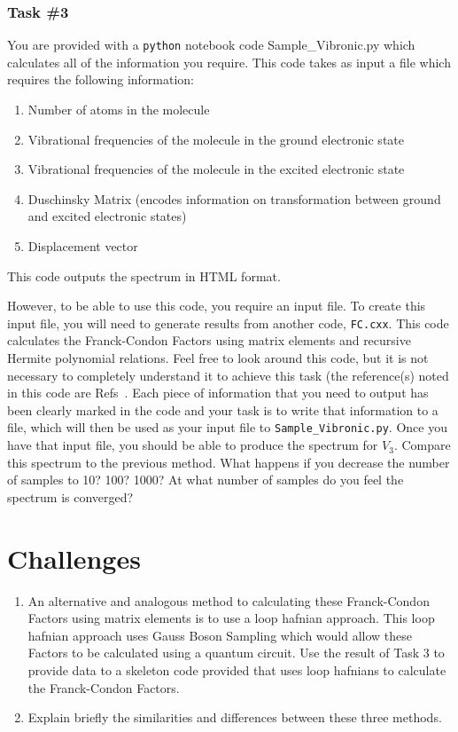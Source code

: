 \documentclass[12pt]{article}
\begin{document}
\subsubsection*{Task \#3}

You are provided with a \texttt{python} notebook code Sample\_Vibronic.py which calculates all of the information you require.
\noindent This code takes as input a file which requires the following information:
\begin{enumerate}
    \item Number of atoms in the molecule
    \item Vibrational frequencies of the molecule in the ground electronic state
    \item Vibrational frequencies of the molecule in the excited electronic state
    \item Duschinsky Matrix (encodes information on transformation between ground and excited electronic states)
    \item Displacement vector
\end{enumerate}

\noindent This code outputs the spectrum in HTML format.

However, to be able to use this code, you require an input file. To create this input file, you will need to generate results from another code, \texttt{FC.cxx}. This code calculates the Franck-Condon Factors using matrix elements and recursive Hermite polynomial relations. Feel free to look around this code, but it is not necessary to completely understand it to achieve this task (the reference(s) noted in this code are Refs~\cite{yang1995structure,doktorov1977dynamical,quesadaFranckCondonFactorsCounting2019}. Each piece of information that you need to output has been clearly marked in the code and your task is to write that information to a file, which will then be used as your input file to \texttt{Sample\_Vibronic.py}. Once you have that input file, you should be able to produce the spectrum for $V_3$. Compare this spectrum to the previous method. What happens if you decrease the number of samples to 10? 100? 1000? At what number of samples do you feel the spectrum is converged?

\section*{Challenges}

\begin{enumerate}
    \item An alternative and analogous method to calculating these Franck-Condon Factors using matrix elements is to use a loop hafnian approach. This loop hafnian approach uses Gauss Boson Sampling which would allow these Factors to be calculated using a quantum circuit. Use the result of Task 3 to provide data to a skeleton code provided that uses loop hafnians to calculate the Franck-Condon Factors.
    \item Explain briefly the similarities and differences between these three methods.
\end{enumerate}
\end{document}
